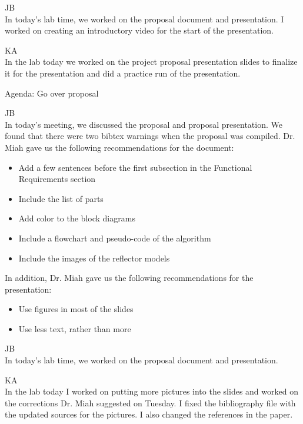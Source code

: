 \documentclass[fontsize=11pt, %
                             paper=letter, %
                             openany, %
                             captions=tableheading,
                             index=totoc,
                             hyperref]{labbook}
\begin{document}
\begin{addmargin}[0cm]{0cm}


JB\\
In today's lab time, we worked on the proposal document and presentation. I worked on creating an introductory video for the start of the presentation.

\vspace*{12pt}
KA\\
In the lab today we worked on the project proposal presentation slides to finalize it for the presentation and did a practice run of the presentation.

Agenda: Go over proposal

JB\\
In today's meeting, we discussed the proposal and proposal presentation. We found that there were two bibtex warnings when the proposal was compiled. Dr. Miah gave us the following recommendations for the document:
\begin{itemize}
    \item Add a few sentences before the first subsection in the Functional Requirements section
    \item Include the list of parts
    \item Add color to the block diagrams
    \item Include a flowchart and pseudo-code of the algorithm
    \item Include the images of the reflector models
\end{itemize}

In addition, Dr. Miah gave us the following recommendations for the presentation:
\begin{itemize}
    \item Use figures in most of the slides
    \item Use less text, rather than more
\end{itemize}



JB\\
In today's lab time, we worked on the proposal document and presentation.

\vspace*{12pt}
KA\\
In the lab today I worked on putting more pictures into the slides and worked on the corrections Dr. Miah suggested on Tuesday. I fixed the bibliography file with the updated sources for the pictures. I also changed the references in the paper.


\end{addmargin}
\end{document}
